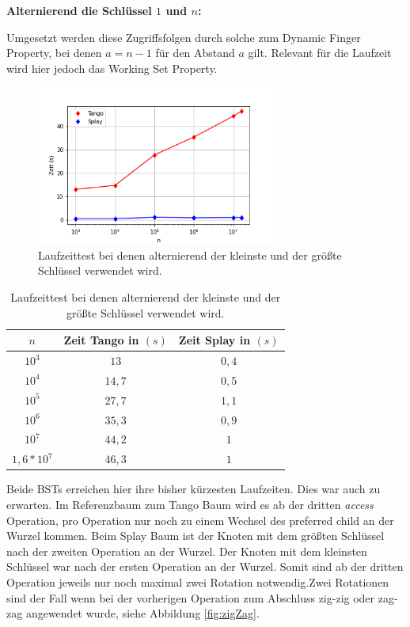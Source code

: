\documentclass[a4paper,12pt]{article}
\begin{document}
\noindent \textbf{Alternierend die Schlüssel $1$ und $n$:\\}
 \bigskip
 
\noindent Umgesetzt werden diese Zugriffsfolgen durch solche zum Dynamic Finger Property, bei denen $a = n -1$ für den Abstand $a$ gilt. Relevant für die Laufzeit wird hier jedoch das Working Set Property.

\begin{figure}[H]
	\centering
	\includegraphics[width=0.7\textwidth]{Medien/laufzeittest/diagramm/kleinGros}
	\caption{Laufzeittest bei denen alternierend der kleinste und der größte Schlüssel verwendet wird.}
\end{figure}
\begin{table}[H]
	\begin{center}
		\begin{tabular}[c]{|c|c|c|}
			\hline
			$n$ & Zeit Tango in $\left(s\right)$ &Zeit Splay in $\left(s\right)$ \\
			\hline
			$10^3$ & $13$ &$0,4$ \\
			\hline
			$10^4$  & $14,7$ &$0,5$  \\
			\hline
			$10^5$  & $27,7$ &$1,1$  \\
			\hline
			$10^6$  & $35,3$ &$0,9$  \\
			\hline
			$10^7$  & $44,2$ &$1$  \\
			\hline
			$1,6 *10^7$  & $46,3$ &$1$  \\
			\hline
		\end{tabular}
		\caption{Laufzeittest bei denen alternierend der kleinste und der größte Schlüssel verwendet wird.} 
	\end{center}
\end{table}
\noindent Beide BSTs erreichen hier ihre bisher kürzesten Laufzeiten. Dies war auch zu erwarten. Im Referenzbaum zum Tango Baum wird es ab der dritten \textit{access} Operation, pro Operation nur noch zu einem Wechsel des preferred child an der Wurzel kommen. Beim Splay Baum ist der Knoten mit dem größten Schlüssel nach der zweiten Operation an der Wurzel. Der Knoten mit dem kleinsten Schlüssel war nach der ersten Operation an der Wurzel. Somit sind ab der dritten Operation jeweils nur noch maximal zwei Rotation notwendig.Zwei Rotationen sind der Fall wenn bei der vorherigen Operation zum Abschluss zig-zig oder zag-zag angewendet wurde, siehe Abbildung \ref{fig:zigZag}.
 
\end{document}
